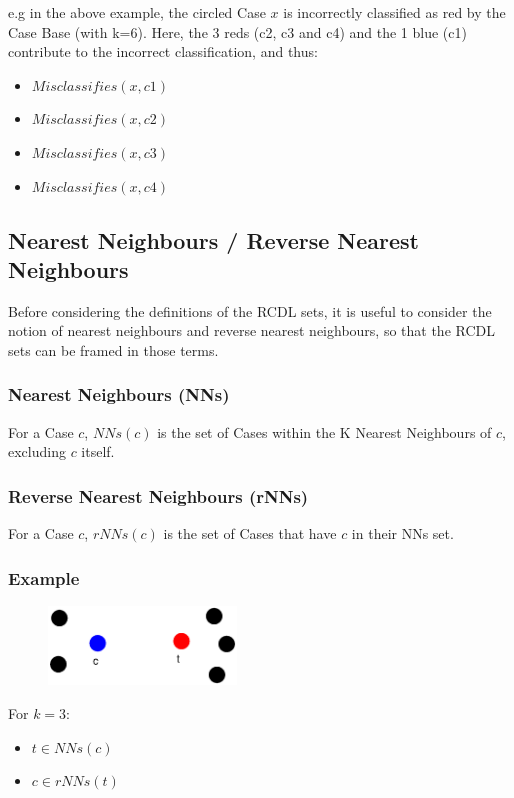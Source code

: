 \documentclass[a4paper,11pt]{report}
\begin{document}
e.g  in the above example, the circled Case $x$ is incorrectly classified as red by the Case Base (with k=6). Here, the 3 reds (c2, c3 and c4) and the 1 blue (c1) contribute to the incorrect classification, and thus:
\begin{itemize}
	\item $ Misclassifies(x, c1) $
	\item $ Misclassifies(x, c2) $
	\item $ Misclassifies(x, c3) $
	\item $ Misclassifies(x, c4) $
\end{itemize}

\subsection{Nearest Neighbours / Reverse Nearest Neighbours}
Before considering the definitions of the RCDL sets, it is useful to consider the notion of nearest neighbours and reverse nearest neighbours, so that the RCDL sets can be framed in those terms.

\subsubsection{Nearest Neighbours (NNs)}
For a Case $c$, $ NNs(c) $ is the set of Cases within the K Nearest Neighbours of $c$, excluding $c$ itself.

\subsubsection{Reverse Nearest Neighbours (rNNs)}
For a Case $c$, $ rNNs(c) $ is the set of Cases that have $c$ in their NNs set.

\subsubsection{Example}
\begin{figure}[h!] \centering
\includegraphics[width=5cm]{./Drawn/RcdlNnRnnEg}
\end{figure}

For $k=3$:
\begin{itemize}
	\item $ t \in NNs(c) $
	\item $ c \in rNNs(t) $
\end{itemize}
\end{document}
